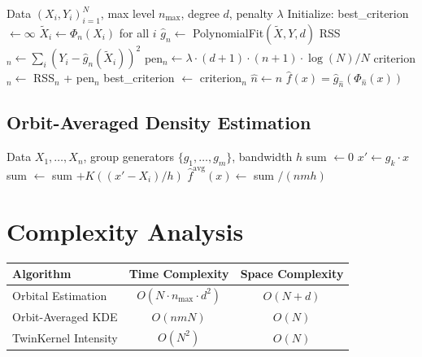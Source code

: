 \documentclass[11pt,twoside,openright]{book}
\theoremstyle{plain}
\theoremstyle{definition}
\theoremstyle{remark}
\begin{document}
\begin{algorithm}[H]
\caption{Adaptive Orbital Estimation}
\label{alg:adaptive-orbital-full}
\begin{algorithmic}[1]
\REQUIRE Data $(X_i, Y_i)_{i=1}^N$, max level $n_{\max}$, degree $d$, penalty $\lambda$
\STATE Initialize: best\_criterion $\gets \infty$
    \STATE $\tilde{X}_i \gets \Phi_n(X_i)$ for all $i$ 
    \STATE $\hat{g}_n \gets$ PolynomialFit$(\tilde{X}, Y, d)$ 
    \STATE RSS$_n \gets \sum_i (Y_i - \hat{g}_n(\tilde{X}_i))^2$
    \STATE pen$_n \gets \lambda \cdot (d+1) \cdot (n+1) \cdot \log(N) / N$
    \STATE criterion$_n \gets$ RSS$_n$ + pen$_n$
        \STATE best\_criterion $\gets$ criterion$_n$
        \STATE $\hat{n} \gets n$
    \ENDIF
\ENDFOR
\RETURN $\hat{f}(x) = \hat{g}_{\hat{n}}(\Phi_{\hat{n}}(x))$
\end{algorithmic}
\end{algorithm}

\subsection{Orbit-Averaged Density Estimation}

\begin{algorithm}[H]
\caption{Orbit-Averaged KDE}
\label{alg:orbit-kde}
\begin{algorithmic}[1]
\REQUIRE Data $X_1, \ldots, X_n$, group generators $\{g_1, \ldots, g_m\}$, bandwidth $h$
    \STATE sum $\gets 0$
        \STATE $x' \gets g_k \cdot x$ 
            \STATE sum $\gets$ sum $+ K((x' - X_i)/h)$
        \ENDFOR
    \ENDFOR
    \STATE $\hat{f}^{\text{avg}}(x) \gets$ sum $/ (nmh)$
\ENDFOR
\end{algorithmic}
\end{algorithm}

\section{Complexity Analysis}

\begin{center}
\begin{tabular}{lcc}
\toprule
Algorithm & Time Complexity & Space Complexity \\
\midrule
Orbital Estimation & $O(N \cdot n_{\max} \cdot d^2)$ & $O(N + d)$ \\
Orbit-Averaged KDE & $O(nmN)$ & $O(N)$ \\
TwinKernel Intensity & $O(N^2)$ & $O(N)$ \\
\bottomrule
\end{tabular}
\end{center}
\end{document}
